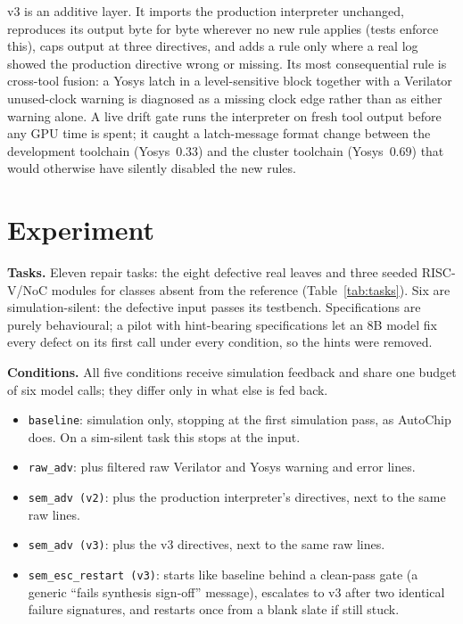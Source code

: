 \documentclass[11pt]{article}
\begin{document}
v3 is an additive layer. It imports the production interpreter unchanged,
reproduces its output byte for byte wherever no new rule applies (tests enforce
this), caps output at three directives, and adds a rule only where a real log
showed the production directive wrong or missing. Its most consequential rule
is cross-tool fusion: a Yosys latch in a level-sensitive block together with a
Verilator unused-clock warning is diagnosed as a missing clock edge rather than
as either warning alone. A live drift gate runs the interpreter on fresh tool
output before any GPU time is spent; it caught a latch-message format change
between the development toolchain (Yosys~$0.33$) and the cluster toolchain
(Yosys~$0.69$) that would otherwise have silently disabled the new rules.

\section{Experiment}
\label{sec:exp}

\textbf{Tasks.} Eleven repair tasks: the eight defective real leaves and three
seeded RISC-V/NoC modules for classes absent from the reference
(Table~\ref{tab:tasks}). Six are simulation-silent: the defective input passes
its testbench. Specifications are purely behavioural; a pilot with
hint-bearing specifications let an $8$B model fix every defect on its first
call under every condition, so the hints were removed.

\textbf{Conditions.} All five conditions receive simulation feedback and share
one budget of six model calls; they differ only in what else is fed back.
\begin{itemize}[leftmargin=1.2em, itemsep=0.1em]
\item \texttt{baseline}: simulation only, stopping at the first simulation
pass, as AutoChip does. On a sim-silent task this stops at the input.
\item \texttt{raw\_adv}: plus filtered raw Verilator and Yosys warning and
error lines.
\item \texttt{sem\_adv (v2)}: plus the production interpreter's directives,
next to the same raw lines.
\item \texttt{sem\_adv (v3)}: plus the v3 directives, next to the same raw
lines.
\item \texttt{sem\_esc\_restart (v3)}: starts like baseline behind a
clean-pass gate (a generic ``fails synthesis sign-off'' message), escalates to
v3 after two identical failure signatures, and restarts once from a blank
slate if still stuck.
\end{itemize}
\end{document}
